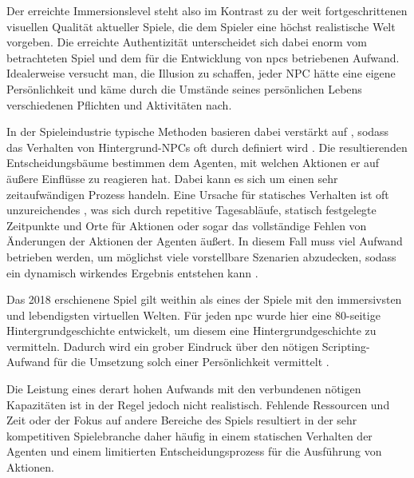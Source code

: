 Der erreichte Immersionslevel steht also im Kontrast zu der weit fortgeschrittenen visuellen Qualität aktueller Spiele, die dem Spieler eine höchst realistische Welt vorgeben. Die erreichte Authentizität unterscheidet sich dabei enorm vom betrachteten Spiel und dem für die Entwicklung von \acp{npc} betriebenen Aufwand. Idealerweise versucht man, die Illusion zu schaffen, jeder NPC hätte eine eigene Persönlichkeit und käme durch die Umstände seines persönlichen Lebens verschiedenen Pflichten und Aktivitäten nach.


In der Spieleindustrie typische Methoden basieren dabei verstärkt auf , sodass das Verhalten von Hintergrund-NPCs oft durch  definiert wird \cite{fallon:believable_background_characters}. Die resultierenden Entscheidungsbäume bestimmen dem Agenten, mit welchen Aktionen er auf äußere Einflüsse zu reagieren hat. Dabei kann es sich um einen sehr zeitaufwändigen Prozess handeln. Eine Ursache für statisches Verhalten ist oft unzureichendes , was sich durch repetitive Tagesabläufe, statisch festgelegte Zeitpunkte und Orte für Aktionen oder sogar das vollständige Fehlen von Änderungen der Aktionen der Agenten äußert. In diesem Fall muss viel Aufwand betrieben werden, um möglichst viele vorstellbare Szenarien abzudecken, sodass ein dynamisch wirkendes Ergebnis entstehen kann \cite{skyrim_cif-ck_interview}.

Das 2018 erschienene Spiel  \cite{rdr2} gilt weithin als eines der Spiele mit den immersivsten und lebendigsten virtuellen Welten. Für jeden \ac{npc} wurde hier eine 80-seitige Hintergrundgeschichte entwickelt, um diesem eine Hintergrundgeschichte zu vermitteln. Dadurch wird ein grober Eindruck über den nötigen Scripting-Aufwand für die Umsetzung solch einer Persönlichkeit vermittelt \cite{rdr2_script_pages}.

Die Leistung eines derart hohen Aufwands mit den verbundenen nötigen Kapazitäten ist in der Regel jedoch nicht realistisch. Fehlende Ressourcen und Zeit oder der Fokus auf andere Bereiche des Spiels resultiert in der sehr kompetitiven Spielebranche daher häufig in einem statischen Verhalten der Agenten und einem limitierten Entscheidungsprozess für die Ausführung von Aktionen. 

